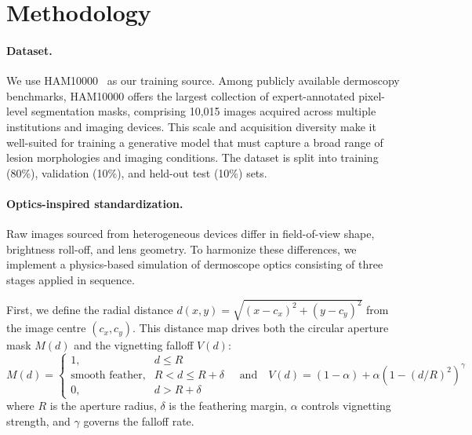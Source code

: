 \section{Methodology}\label{sec:method}


\paragraph{Dataset.}
We use HAM10000~\cite{Tschandl2018HAM10000} as our training source. Among publicly available dermoscopy benchmarks, HAM10000 offers the largest collection of expert-annotated pixel-level segmentation masks, comprising 10,015 images acquired across multiple institutions and imaging devices. This scale and acquisition diversity make it well-suited for training a generative model that must capture a broad range of lesion morphologies and imaging conditions. The dataset is split into training (80\%), validation (10\%), and held-out test (10\%) sets.

\paragraph{Optics-inspired standardization.}
Raw images sourced from heterogeneous devices differ in field-of-view shape, brightness roll-off, and lens geometry. To harmonize these differences, we implement a physics-based simulation of dermoscope optics consisting of three stages applied in sequence.

First, we define the radial distance $d(x, y) = \sqrt{(x - c_x)^2 + (y - c_y)^2}$ from the image centre $(c_x, c_y)$. This distance map drives both the circular aperture mask $M(d)$ and the vignetting falloff $V(d)$:
\begin{equation}
    M(d) = \begin{cases}
               1, & d \leq R \\
               \text{smooth feather}, & R < d \leq R + \delta \\
               0, & d > R + \delta
    \end{cases}
    \quad \text{and} \quad
    V(d) = (1 - \alpha) + \alpha \left( 1 - (d/R)^2 \right)^\gamma
\end{equation}
where $R$ is the aperture radius, $\delta$ is the feathering margin, $\alpha$ controls vignetting strength, and $\gamma$ governs the falloff rate.


